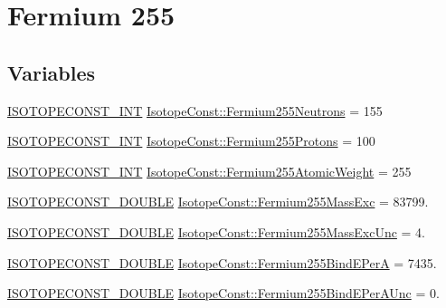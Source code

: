 \hypertarget{group___isotope_const-_fermium-_fm255}{}\section{Fermium 255}
\label{group___isotope_const-_fermium-_fm255}
\subsection*{Variables}
\begin{DoxyCompactItemize}
\item 
\mbox{\hyperlink{group___isotope_const-_macros_ga5f18360b3e99483a35c32d789e62621c}{I\+S\+O\+T\+O\+P\+E\+C\+O\+N\+S\+T\+\_\+\+I\+NT}} \mbox{\hyperlink{group___isotope_const-_fermium-_fm255_ga65653b584af8afb51ed5ec59e7b8dd64}{Isotope\+Const\+::\+Fermium255\+Neutrons}} = 155
\item 
\mbox{\hyperlink{group___isotope_const-_macros_ga5f18360b3e99483a35c32d789e62621c}{I\+S\+O\+T\+O\+P\+E\+C\+O\+N\+S\+T\+\_\+\+I\+NT}} \mbox{\hyperlink{group___isotope_const-_fermium-_fm255_ga02b626194156fc833a8e16e652d4f250}{Isotope\+Const\+::\+Fermium255\+Protons}} = 100
\item 
\mbox{\hyperlink{group___isotope_const-_macros_ga5f18360b3e99483a35c32d789e62621c}{I\+S\+O\+T\+O\+P\+E\+C\+O\+N\+S\+T\+\_\+\+I\+NT}} \mbox{\hyperlink{group___isotope_const-_fermium-_fm255_ga3d4c7dc3b6f23a3c10f6ec70162ac2b4}{Isotope\+Const\+::\+Fermium255\+Atomic\+Weight}} = 255
\item 
\mbox{\hyperlink{group___isotope_const-_macros_ga8f45a7272ce02c0b4c65c44636ed719a}{I\+S\+O\+T\+O\+P\+E\+C\+O\+N\+S\+T\+\_\+\+D\+O\+U\+B\+LE}} \mbox{\hyperlink{group___isotope_const-_fermium-_fm255_ga32d9cd8f6e2452449e6de861a46113cf}{Isotope\+Const\+::\+Fermium255\+Mass\+Exc}} = 83799.
\item 
\mbox{\hyperlink{group___isotope_const-_macros_ga8f45a7272ce02c0b4c65c44636ed719a}{I\+S\+O\+T\+O\+P\+E\+C\+O\+N\+S\+T\+\_\+\+D\+O\+U\+B\+LE}} \mbox{\hyperlink{group___isotope_const-_fermium-_fm255_ga7b6a2c0f40d350d0d8942e8cfc074327}{Isotope\+Const\+::\+Fermium255\+Mass\+Exc\+Unc}} = 4.
\item 
\mbox{\hyperlink{group___isotope_const-_macros_ga8f45a7272ce02c0b4c65c44636ed719a}{I\+S\+O\+T\+O\+P\+E\+C\+O\+N\+S\+T\+\_\+\+D\+O\+U\+B\+LE}} \mbox{\hyperlink{group___isotope_const-_fermium-_fm255_gafd9bbb0d9befcb0e3bdb31494a3e7d00}{Isotope\+Const\+::\+Fermium255\+Bind\+E\+PerA}} = 7435.
\item 
\mbox{\hyperlink{group___isotope_const-_macros_ga8f45a7272ce02c0b4c65c44636ed719a}{I\+S\+O\+T\+O\+P\+E\+C\+O\+N\+S\+T\+\_\+\+D\+O\+U\+B\+LE}} \mbox{\hyperlink{group___isotope_const-_fermium-_fm255_ga534496cf258ffad10f598ab69ba6b1f6}{Isotope\+Const\+::\+Fermium255\+Bind\+E\+Per\+A\+Unc}} = 0.

\end{DoxyCompactItemize}

